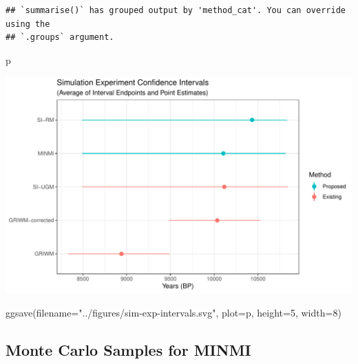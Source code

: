\documentclass[
]{article}
\newenvironment{Shaded}{\begin{snugshade}}{\end{snugshade}}
\newcommand{\AttributeTok}[1]{\textcolor[rgb]{0.77,0.63,0.00}{#1}}
\newcommand{\DecValTok}[1]{\textcolor[rgb]{0.00,0.00,0.81}{#1}}
\newcommand{\FunctionTok}[1]{\textcolor[rgb]{0.00,0.00,0.00}{#1}}
\newcommand{\NormalTok}[1]{#1}
\newcommand{\StringTok}[1]{\textcolor[rgb]{0.31,0.60,0.02}{#1}}
\begin{document}
\begin{verbatim}
## `summarise()` has grouped output by 'method_cat'. You can override using the
## `.groups` argument.
\end{verbatim}

\begin{Shaded}
\begin{Highlighting}[]
\NormalTok{p}
\end{Highlighting}
\end{Shaded}

\includegraphics{sim_exp-results_files/figure-latex/unnamed-chunk-7-1.pdf}

\begin{Shaded}
\begin{Highlighting}[]
\FunctionTok{ggsave}\NormalTok{(}\AttributeTok{filename=}\StringTok{"../figures/sim{-}exp{-}intervals.svg"}\NormalTok{, }\AttributeTok{plot=}\NormalTok{p, }\AttributeTok{height=}\DecValTok{5}\NormalTok{, }\AttributeTok{width=}\DecValTok{8}\NormalTok{)}
\end{Highlighting}
\end{Shaded}

\hypertarget{monte-carlo-samples-for-minmi}{%
\subsection{Monte Carlo Samples for
MINMI}\label{monte-carlo-samples-for-minmi}}
\end{document}
